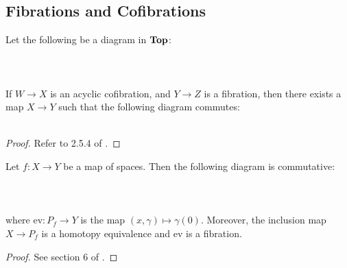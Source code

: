\subsection{Fibrations and Cofibrations}
\begin{prp}\label{prp:Lift} Let the following be a diagram in $\bold{Top}$: \\~\\
\\~\\
If $W\to X$ is an acyclic cofibration, and $Y\to Z$ is a fibration, then there exists a map $X\to Y$ such that the following diagram commutes: \\~\\
\begin{proof}
Refer to 2.5.4 of \cite{CHT}. 
\end{proof}
\end{prp}

\begin{prp}\label{prp:Factorization} Let $f:X\to Y$ be a map of spaces. Then the following diagram is commutative: \\~\\
\\~\\
where $\text{ev}:P_f\to Y$ is the map $(x,\gamma)\mapsto\gamma(0)$. Moreover, the inclusion map $X\to P_f$ is a homotopy equivalence and $\text{ev}$ is a fibration. 
\begin{proof}
See section 6 of \cite{LNAT}. 
\end{proof}
\end{prp}

